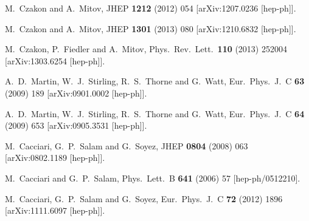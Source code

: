 \documentclass[preprintnumbers,superscriptaddress,nofootinbib,aps,prd,floatfix]{revtex4}
\begin{document}
\begin{thebibliography}{99}
  M.~Czakon and A.~Mitov,
  JHEP {\bf 1212} (2012) 054
  [arXiv:1207.0236 [hep-ph]].
      
  
  M.~Czakon and A.~Mitov,
  JHEP {\bf 1301} (2013) 080
  [arXiv:1210.6832 [hep-ph]].


  M.~Czakon, P.~Fiedler and A.~Mitov,
  Phys.\ Rev.\ Lett.\  {\bf 110} (2013) 252004
  [arXiv:1303.6254 [hep-ph]].


  A.~D.~Martin, W.~J.~Stirling, R.~S.~Thorne and G.~Watt,
  Eur.\ Phys.\ J.\ C {\bf 63} (2009) 189
  [arXiv:0901.0002 [hep-ph]].


  A.~D.~Martin, W.~J.~Stirling, R.~S.~Thorne and G.~Watt,
  Eur.\ Phys.\ J.\ C {\bf 64} (2009) 653
  [arXiv:0905.3531 [hep-ph]].


  M.~Cacciari, G.~P.~Salam and G.~Soyez,
  JHEP {\bf 0804} (2008) 063
  [arXiv:0802.1189 [hep-ph]].
  
  M.~Cacciari and G.~P.~Salam,
  Phys.\ Lett.\ B {\bf 641} (2006) 57
  [hep-ph/0512210].
  
  M.~Cacciari, G.~P.~Salam and G.~Soyez,
  Eur.\ Phys.\ J.\ C {\bf 72} (2012) 1896
  [arXiv:1111.6097 [hep-ph]].
       

\end{thebibliography}
\end{document}
